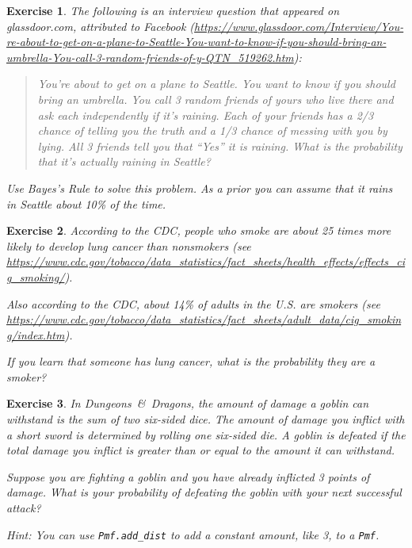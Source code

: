 \documentclass[12pt]{book}
\theoremstyle{exercise}
\newtheorem{exercise}{Exercise}[chapter]
\newcommand{\py}[1]{{\tt #1}}%
\begin{document}
\begin{exercise}
The following is an interview question that appeared on glassdoor.com, attributed to Facebook (\url{https://www.glassdoor.com/Interview/You-re-about-to-get-on-a-plane-to-Seattle-You-want-to-know-if-you-should-bring-an-umbrella-You-call-3-random-friends-of-y-QTN_519262.htm}):

\begin{quote}
You're about to get on a plane to Seattle. You want to know if you should bring an umbrella. You call 3 random friends of yours who live there and ask each independently if it's raining. Each of your friends has a 2/3 chance of telling you the truth and a 1/3 chance of messing with you by lying. All 3 friends tell you that ``Yes'' it is raining. What is the probability that it's actually raining in Seattle?
\end{quote}

Use Bayes's Rule to solve this problem.  As a prior you can assume that it rains in Seattle about 10\% of the time.
\end{exercise}


\begin{exercise}
According to the CDC, people who smoke are about 25 times more likely to develop lung cancer than nonsmokers (see \url{https://www.cdc.gov/tobacco/data_statistics/fact_sheets/health_effects/effects_cig_smoking/}).

Also according to the CDC, about 14\% of adults in the U.S. are smokers (see \url{https://www.cdc.gov/tobacco/data_statistics/fact_sheets/adult_data/cig_smoking/index.htm}).

If you learn that someone has lung cancer, what is the probability they are a smoker?
\end{exercise}


\begin{exercise}
In {\it Dungeons~\&~Dragons}, the amount of damage a goblin can withstand is the sum of two six-sided dice. The amount of damage you inflict with a short sword is determined by rolling one six-sided die.
A goblin is defeated if the total damage you inflict is greater than or equal to the amount it can withstand.

Suppose you are fighting a goblin and you have already inflicted 3 points of damage. What is your probability of defeating the goblin with your next successful attack?

Hint: You can use \py{Pmf.add_dist} to add a constant amount, like 3, to a \py{Pmf}.
\end{exercise}
\end{document}
